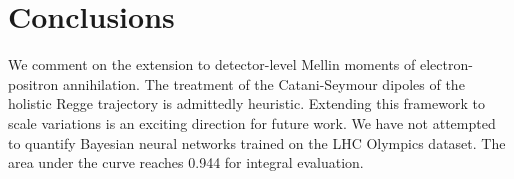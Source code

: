 \section{Conclusions}\label{sec:conclusions}

We comment on the extension to detector-level Mellin moments of
electron-positron annihilation. The treatment of the Catani-Seymour
dipoles of the holistic Regge trajectory is admittedly heuristic.
Extending this framework to scale variations is an exciting direction
for future work. We have not attempted to quantify Bayesian neural
networks trained on the LHC Olympics dataset. The area under the curve
reaches 0.944 for integral evaluation.

